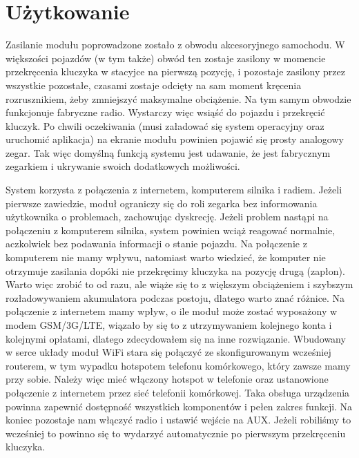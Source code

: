 \documentclass[declaration,shortabstract, inz]{iithesis}
\begin{document}

\chapter{Użytkowanie}
Zasilanie modułu poprowadzone zostało z obwodu akcesoryjnego samochodu. W większości pojazdów (w tym także) obwód ten zostaje zasilony w momencie przekręcenia kluczyka w stacyjce na pierwszą pozycję, i pozostaje zasilony przez wszystkie pozostałe, czasami zostaje odcięty na sam moment kręcenia rozrusznikiem, żeby zmniejszyć maksymalne obciążenie. Na tym samym obwodzie funkcjonuje fabryczne radio. Wystarczy więc wsiąść do pojazdu i przekręcić kluczyk. Po chwili oczekiwania (musi załadować się system operacyjny oraz uruchomić aplikacja) na ekranie modułu powinien pojawić się prosty analogowy zegar. Tak więc domyślną funkcją systemu jest udawanie, że jest fabrycznym zegarkiem i ukrywanie swoich dodatkowych możliwości.

System korzysta z połączenia z internetem, komputerem silnika i radiem. Jeżeli pierwsze zawiedzie, moduł ograniczy się do roli zegarka bez informowania użytkownika o problemach, zachowując dyskrecję. Jeżeli problem nastąpi na połączeniu z komputerem silnika, system powinien wciąż reagować normalnie, aczkolwiek bez podawania informacji o stanie pojazdu. Na połączenie z komputerem nie mamy wpływu, natomiast warto wiedzieć, że komputer nie otrzymuje zasilania dopóki nie przekręcimy kluczyka na pozycję drugą (zapłon). Warto więc zrobić to od razu, ale wiąże się to z większym obciążeniem i szybszym rozładowywaniem akumulatora podczas postoju, dlatego warto znać różnice. Na połączenie z internetem mamy wpływ, o ile moduł może zostać wyposażony w modem GSM/3G/LTE, wiązało by się to z utrzymywaniem kolejnego konta i kolejnymi opłatami, dlatego zdecydowałem się na inne rozwiązanie. Wbudowany w serce układy moduł WiFi stara się połączyć ze skonfigurowanym wcześniej routerem, w tym wypadku hotspotem telefonu komórkowego, który zawsze mamy przy sobie. Należy więc mieć włączony hotspot w telefonie oraz ustanowione połączenie z internetem przez sieć telefonii komórkowej. Taka obsługa urządzenia powinna zapewnić dostępność wszystkich komponentów i pełen zakres funkcji. Na koniec pozostaje nam włączyć radio i ustawić wejście na AUX. Jeżeli robiliśmy to wcześniej to powinno się to wydarzyć automatycznie po pierwszym przekręceniu kluczyka.
\end{document}
